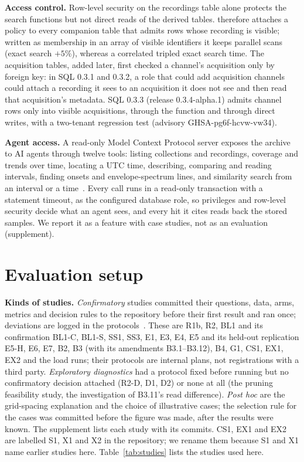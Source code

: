 \documentclass[sigconf]{acmart}
\begin{document}
\textbf{Access control.} Row-level security on the recordings table alone protects the search functions but not direct reads of the derived tables.  therefore attaches a policy to every companion table that admits rows whose recording is visible; written as membership in an array of visible identifiers it keeps parallel scans (exact search $+5\%$), whereas a correlated  tripled exact search time. The acquisition tables, added later, first checked a channel's acquisition only by foreign key: in SQL 0.3.1 and 0.3.2, a role that could add acquisition channels could attach a recording it sees to an acquisition it does not see and then read that acquisition's metadata. SQL 0.3.3 (release 0.3.4-alpha.1) admits channel rows only into visible acquisitions, through the function and through direct writes, with a two-tenant regression test (advisory GHSA-pg6f-hcvw-vw34).

\textbf{Agent access.} A read-only Model Context Protocol server exposes the archive to AI agents through twelve tools: listing collections and recordings, coverage and trends over time, locating a UTC time, describing, comparing and reading intervals, finding onsets and envelope-spectrum lines, and similarity search from an interval or a time~\cite{mcp}. Every call runs in a read-only transaction with a statement timeout, as the configured database role, so privileges and row-level security decide what an agent sees, and every hit it cites reads back the stored samples. We report it as a feature with case studies, not as an evaluation (supplement).

\section{Evaluation setup}\label{sec:setup}
\textbf{Kinds of studies.} \emph{Confirmatory} studies committed their questions, data, arms, metrics and decision rules to the repository before their first result and ran once; deviations are logged in the protocols~\cite{repo}. These are R1b, R2, BL1 and its confirmation BL1-C, BL1-S, SS1, SS3, E1, E3, E4, E5 and its held-out replication E5-H, E6, E7, B2, B3 (with its amendments B3.1--B3.12), B4, G1, CS1, EX1, EX2 and the load runs; their protocols are internal plans, not registrations with a third party. \emph{Exploratory diagnostics} had a protocol fixed before running but no confirmatory decision attached (R2-D, D1, D2) or none at all (the pruning feasibility study, the investigation of B3.11's read difference). \emph{Post hoc} are the grid-spacing explanation and the choice of illustrative cases; the selection rule for the cases was committed before the figure was made, after the results were known. The supplement lists each study with its commits. CS1, EX1 and EX2 are labelled S1, X1 and X2 in the repository; we rename them because S1 and X1 name earlier studies here. Table~\ref{tab:studies} lists the studies used here.
\end{document}
